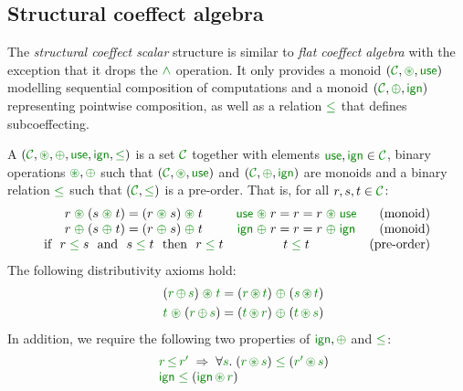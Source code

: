 
\subsection{Structural coeffect algebra}

The \emph{structural coeffect scalar} structure is similar to \emph{flat coeffect algebra} with the
exception that it drops the $\czip$ operation. It only provides a monoid $(\C, \cseq, \cunit)$
modelling sequential composition of computations and a monoid $(\C, \cpar, \czero)$ representing
pointwise composition, as well as a relation $\cleq$ that defines subcoeffecting.

\begin{definition}
\label{def:structural-scalar}
A \emph{} $(\C, \cseq, \cpar, \cunit, \czero, \cleq)$ is a set
$\C$ together with elements $\cunit, \czero \in \C$, binary operations $\cseq, \cpar$ such that
$(\C, \cseq, \cunit)$ and $(\C, \cpar, \czero)$ are monoids and a binary relation $\cleq$ such
that $(\C, \cleq)$ is a pre-order. That is, for all $r,s,t\in \C$:
%
\begin{equation*}
\begin{array}{ccr}
r \;\cseq\; (s \;\cseq\; t) = (r \;\cseq\; s) \;\cseq\; t  &
\cunit \;\cseq\; r = r = r \;\cseq\; \cunit &
\textnormal{(monoid)}
\\
r \;\cpar\; (s \;\cpar\; t) = (r \;\cpar\; s) \;\cpar\; t &
\czero \;\cpar\; r = r = r \;\cpar\; \czero &
\textnormal{(monoid)}
\\
\textnormal{if}~~r\; \cleq\; s ~~\textnormal{and}~~s\; \cleq\; t~~\textnormal{then}~~r\; \cleq\; t&
t\; \cleq\; t &
\textnormal{(pre-order)}
\\
\end{array}
\end{equation*}
%
The following distributivity axioms hold:
\begin{align*}
\quad (\cclrd{r}\, \cpar\, \cclrd{s}) \;\cseq\; \cclrd{t} & = (\cclrd{r} \,\cseq\, \cclrd{t}) \;\cpar\; (\cclrd{s}\, \cseq\, \cclrd{t}) \\
\quad \cclrd{t} \;\cseq\; (\cclrd{r}\, \cpar\, \cclrd{s}) & = (\cclrd{t} \,\cseq\, \cclrd{r}) \;\cpar\; (\cclrd{t}\, \cseq\, \cclrd{s})
\end{align*}
%
In addition, we require the following two properties of $\czero, \cpar$ and $\cleq$:
\begin{equation*}
\begin{array}{l}
 \quad \cclrd{r}\,\cleq\,\cclrd{r'} \; \Rightarrow \; \forall\cclrd{s}.\;(\cclrd{r}\,\cseq\,\cclrd{s})\;\cleq\;(\cclrd{r'}\,\cseq\,\cclrd{s}) \\
 \quad \czero\;\cleq\;(\czero\,\cseq\,\cclrd{r})
\end{array}
\end{equation*}
\end{definition}

